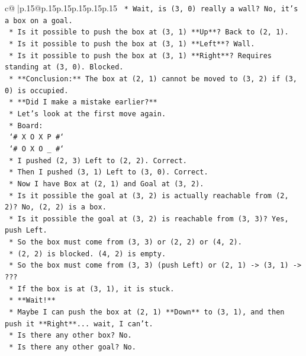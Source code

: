 \documentclass{article}
\begin{document}
{\begin{supertabular}{c@{$\;$}|p{.15\linewidth}@{}p{.15\linewidth}p{.15\linewidth}p{.15\linewidth}p{.15\linewidth}p{.15\linewidth}}
{{{\texttt{        *   Wait, is (3, 0) really a wall? No, it's a box on a goal.} \\
\texttt{        *   Is it possible to push the box at (3, 1) **Up**? Back to (2, 1).} \\
\texttt{        *   Is it possible to push the box at (3, 1) **Left**? Wall.} \\
\texttt{        *   Is it possible to push the box at (3, 1) **Right**? Requires standing at (3, 0). Blocked.} \\
\texttt{        *   **Conclusion:** The box at (2, 1) cannot be moved to (3, 2) if (3, 0) is occupied.} \\
\texttt{        *   **Did I make a mistake earlier?**} \\
\texttt{        *   Let's look at the first move again.} \\
\texttt{        *   Board:} \\
\texttt{            `\# X O X P \#`} \\
\texttt{            `\# O X O \_ \#`} \\
\texttt{        *   I pushed (2, 3) Left to (2, 2). Correct.} \\
\texttt{        *   Then I pushed (3, 1) Left to (3, 0). Correct.} \\
\texttt{        *   Now I have Box at (2, 1) and Goal at (3, 2).} \\
\texttt{        *   Is it possible the goal at (3, 2) is actually reachable from (2, 2)? No, (2, 2) is a box.} \\
\texttt{        *   Is it possible the goal at (3, 2) is reachable from (3, 3)? Yes, push Left.} \\
\texttt{        *   So the box must come from (3, 3) or (2, 2) or (4, 2).} \\
\texttt{        *   (2, 2) is blocked. (4, 2) is empty.} \\
\texttt{        *   So the box must come from (3, 3) (push Left) or (2, 1) {-}> (3, 1) {-}> ???} \\
\texttt{        *   If the box is at (3, 1), it is stuck.} \\
\texttt{        *   **Wait!**} \\
\texttt{        *   Maybe I can push the box at (2, 1) **Down** to (3, 1), and then push it **Right**... wait, I can't.} \\
\texttt{        *   Is there any other box? No.} \\
\texttt{        *   Is there any other goal? No.} \\
}}}
\end{supertabular}}
\end{document}
